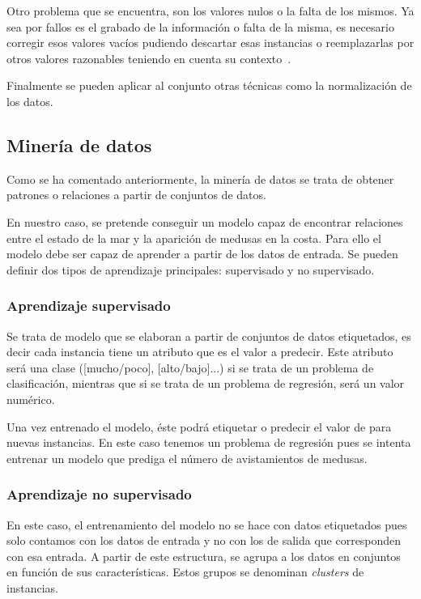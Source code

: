 Otro problema que se encuentra, son los valores nulos o la falta de los mismos. Ya sea por fallos es el grabado de la información o falta de la misma, es necesario corregir esos valores vacíos pudiendo descartar esas instancias o reemplazarlas por otros valores razonables teniendo en cuenta su contexto~\cite{libro_mineria}.

Finalmente se pueden aplicar al conjunto otras técnicas como la normalización de los datos.

\subsection{Minería de datos}
Como se ha comentado anteriormente, la minería de datos se trata de obtener patrones o relaciones a partir de conjuntos de datos.

En nuestro caso, se pretende conseguir un modelo capaz de encontrar relaciones entre el estado de la mar y la aparición de medusas en la costa. Para ello el modelo debe ser capaz de aprender a partir de los datos de entrada. Se pueden definir dos tipos de aprendizaje principales: supervisado y no supervisado.

\subsubsection{Aprendizaje supervisado}
Se trata de modelo que se elaboran a partir de conjuntos de datos etiquetados, es decir cada instancia tiene un atributo que es el valor a predecir. Este atributo será una clase ([mucho/poco], [alto/bajo]...) si se trata de un problema de clasificación, mientras que si se trata de un problema de regresión, será un valor numérico.

Una vez entrenado el modelo, éste podrá etiquetar o predecir el valor de para nuevas instancias.
En este caso tenemos un problema de regresión pues se intenta entrenar un modelo que prediga el número de avistamientos de medusas.

\subsubsection{Aprendizaje no supervisado}
En este caso, el entrenamiento del modelo no se hace con datos etiquetados pues solo contamos con los datos de entrada y no con los de salida que corresponden con esa entrada. A partir de este estructura, se agrupa a los datos en conjuntos en función de sus características. Estos grupos se denominan \emph{clusters} de instancias.

